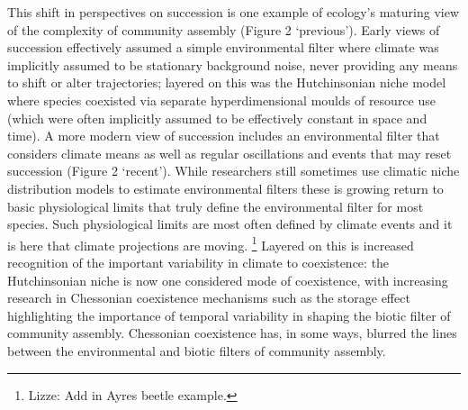 \documentclass[11pt,a4paper,oneside]{article}
\begin{document}
This shift in perspectives on succession is one example of ecology's maturing view of the complexity of community assembly (Figure 2 `previous'). Early views of succession effectively assumed a simple environmental filter where climate was implicitly assumed to be stationary background noise, never providing any means to shift or alter trajectories; layered on this was the Hutchinsonian niche model where species coexisted via separate hyperdimensional moulds of resource use (which were often implicitly assumed to be effectively constant in space and time). A more modern view of succession includes an environmental filter that considers climate means as well as regular oscillations and events that may reset succession (Figure 2 `recent'). While researchers still sometimes use climatic niche distribution models to estimate environmental filters these is growing return to basic physiological limits that truly define the environmental filter for most species. Such physiological limits are most often defined by climate events and it is here that climate projections are moving. \footnote{Lizze: Add in Ayres beetle example.} Layered on this is increased recognition of the important variability in climate to coexistence: the Hutchinsonian niche is now one considered mode of coexistence, with increasing research in Chessonian coexistence mechanisms such as the storage effect highlighting the importance of temporal variability in shaping the biotic filter of community assembly. Chessonian coexistence has, in some ways, blurred the lines between the environmental and biotic filters of community assembly. \\
\end{document}
